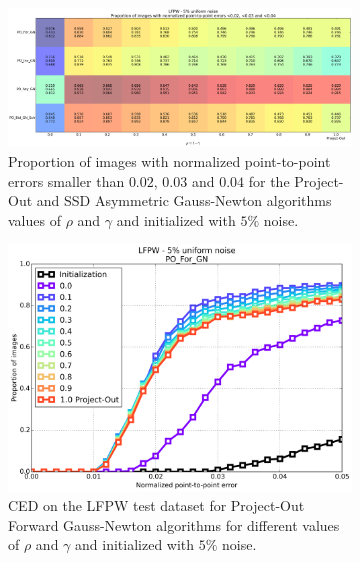 \begin{figure}[h!]
	\centering
	\begin{subfigure}{\textwidth}
	    \includegraphics[width=\textwidth]{experiments/rho/convergence_vs_rho_po_gn_5.png}
	    \caption{Proportion of images with normalized point-to-point errors smaller than $0.02$, $0.03$ and $0.04$ for the Project-Out and SSD Asymmetric Gauss-Newton algorithms values of $\rho$ and $\gamma$ and initialized with $5\%$ noise.}
	    \label{fig:convergence_vs_rho_po_gn}
	\end{subfigure}
	\par\medskip
	\begin{subfigure}{0.48\textwidth}
	    \includegraphics[width=\textwidth]{experiments/rho/ced_po_for_gn_5.png}
	    \caption{CED on the LFPW test dataset for Project-Out Forward Gauss-Newton algorithms for different values of $\rho$ and $\gamma$ and initialized with $5\%$ noise.}
	    \label{fig:ced_po_for_gn}
	\end{subfigure}
	\hfill
	\begin{subfigure}{0.48\textwidth}

\end{subfigure}
\end{figure}
